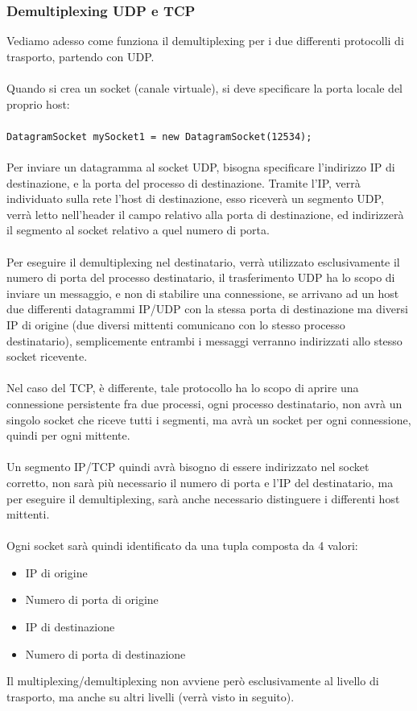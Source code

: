 \documentclass[12pt, letterpaper]{article}
\newcommand{\code}[1]{\colorbox{light-gray}{\texttt{#1}}}
\newcommand{\acc}{\\\hphantom{}\\}
\begin{document}
\subsubsection{Demultiplexing UDP e TCP}
Vediamo adesso come funziona il demultiplexing per i due differenti protocolli di trasporto, partendo con 
UDP.\acc 
Quando si crea un socket (canale virtuale), si deve specificare la porta locale del proprio host:\acc 
\code{DatagramSocket mySocket1 = new DatagramSocket(12534);}
\acc 
Per inviare un datagramma al socket UDP, bisogna specificare l'indirizzo IP di destinazione, e la porta del 
processo di destinazione. Tramite l'IP, verrà individuato sulla rete l'host di destinazione, esso riceverà un 
segmento UDP, verrà letto nell'header il campo relativo alla porta di destinazione, ed indirizzerà il 
segmento al socket relativo a quel numero di porta.\acc 
Per eseguire il demultiplexing nel destinatario, verrà utilizzato esclusivamente il numero di porta 
del processo destinatario, il trasferimento UDP ha lo scopo di inviare un messaggio, e non di stabilire una 
connessione, se arrivano ad un host due differenti datagrammi IP/UDP con la stessa porta di destinazione ma 
diversi IP di origine (due diversi mittenti comunicano con lo stesso processo destinatario), semplicemente 
entrambi i messaggi verranno indirizzati allo stesso socket ricevente.\acc 
Nel caso del TCP, è differente, tale protocollo ha lo scopo di aprire una connessione persistente fra due 
processi, ogni processo destinatario, non avrà un singolo socket che riceve tutti i segmenti, ma avrà 
un socket per ogni connessione, quindi per ogni mittente.\acc 
Un segmento IP/TCP quindi avrà bisogno di essere indirizzato nel socket corretto, non sarà più necessario 
il numero di porta e l'IP del destinatario, ma per eseguire il demultiplexing, sarà anche necessario 
distinguere i differenti host mittenti. \acc 
Ogni socket sarà quindi identificato da una tupla composta da 4 valori:\begin{itemize}
    \item IP di origine 
    \item Numero di porta di origine
    \item IP di destinazione 
    \item Numero di porta di destinazione
\end{itemize}
Il multiplexing/demultiplexing non avviene però esclusivamente al livello di trasporto, ma anche su altri 
livelli (verrà visto in seguito).
\end{document}
